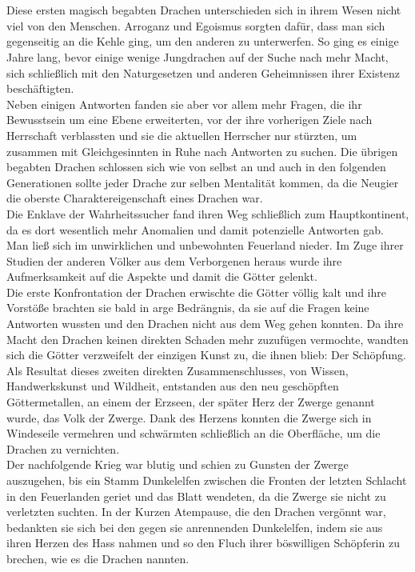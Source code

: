 \documentclass[a4paper,12pt,oneside]{book}
\begin{document}
\\\\Diese ersten magisch begabten Drachen unterschieden sich in ihrem Wesen nicht viel von den Menschen. Arroganz und Egoismus sorgten dafür, dass man sich gegenseitig an die Kehle ging, um den anderen zu unterwerfen. So ging es einige Jahre lang, bevor einige wenige Jungdrachen auf der Suche nach mehr Macht, sich schließlich mit den Naturgesetzen und anderen Geheimnissen ihrer Existenz beschäftigten.
\\Neben einigen Antworten fanden sie aber vor allem mehr Fragen, die ihr Bewusstsein um eine Ebene erweiterten, vor der ihre vorherigen Ziele nach Herrschaft verblassten und sie die aktuellen Herrscher nur stürzten, um zusammen mit Gleichgesinnten in Ruhe nach Antworten zu suchen. Die übrigen begabten Drachen schlossen sich wie von selbst an und auch in den folgenden Generationen sollte jeder Drache zur selben Mentalität kommen, da die Neugier die oberste Charaktereigenschaft eines Drachen war.
\\Die Enklave der Wahrheitssucher fand ihren Weg schließlich zum Hauptkontinent, da es dort wesentlich mehr Anomalien und damit potenzielle Antworten gab. Man ließ sich im unwirklichen und unbewohnten Feuerland nieder. Im Zuge ihrer Studien der anderen Völker aus dem Verborgenen heraus wurde ihre Aufmerksamkeit auf die Aspekte und damit die Götter gelenkt.
\\Die erste Konfrontation der Drachen erwischte die Götter völlig kalt und ihre Vorstöße brachten sie bald in arge Bedrängnis, da sie auf die Fragen keine Antworten wussten und den Drachen nicht aus dem Weg gehen konnten. Da ihre Macht den Drachen keinen direkten Schaden mehr zuzufügen vermochte, wandten sich die Götter verzweifelt der einzigen Kunst zu, die ihnen blieb: Der Schöpfung.
\\Als Resultat dieses zweiten direkten Zusammenschlusses, von Wissen, Handwerkskunst und Wildheit, entstanden aus den neu geschöpften Göttermetallen, an einem der Erzseen, der später Herz der Zwerge genannt wurde, das Volk der Zwerge. Dank des Herzens konnten die Zwerge sich in Windeseile vermehren und schwärmten schließlich an die Oberfläche, um die Drachen zu vernichten.
\\Der nachfolgende Krieg war blutig und schien zu Gunsten der Zwerge auszugehen, bis ein Stamm Dunkelelfen zwischen die Fronten der letzten Schlacht in den Feuerlanden geriet und das Blatt wendeten, da die Zwerge sie nicht zu verletzten suchten. In der Kurzen Atempause, die den Drachen vergönnt war, bedankten sie sich bei den gegen sie anrennenden Dunkelelfen, indem sie aus ihren Herzen des Hass nahmen und so den Fluch ihrer böswilligen Schöpferin zu brechen, wie es die Drachen nannten.
\end{document}
